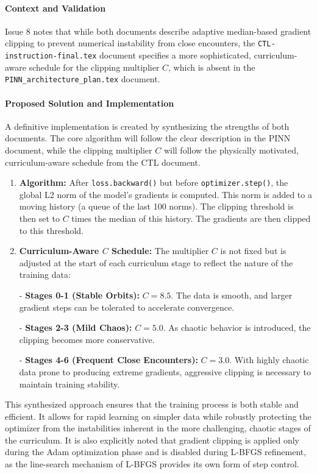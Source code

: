 \documentclass[11pt, a4paper]{article}
\begin{document}
\paragraph{Context and Validation}
Issue 8 notes that while both documents describe adaptive median-based gradient clip\-ping to prevent numerical instability from close encounters, the \texttt{CTL-instruction-\allowbreak final.tex} document specifies a more sophisticated, curriculum-aware schedule for the clipping multiplier $C$, which is absent in the \texttt{PINN\_\allowbreak architecture\_\allowbreak plan.tex} document.

\paragraph{Proposed Solution and Implementation}
A definitive implementation is created by synthesizing the strengths of both documents. The core algorithm will follow the clear description in the PINN document, while the clipping multiplier $C$ will follow the physically motivated, curriculum-aware schedule from the CTL document.
\begin{enumerate}
    \item \textbf{Algorithm:} After \texttt{loss.backward()} but before \texttt{optimizer.step()}, the global L2 norm of the model's gradients is computed. This norm is added to a moving history (a queue of the last 100 norms). The clipping threshold is then set to $C$ times the median of this history. The gradients are then clipped to this threshold.
    \item \textbf{Curriculum-Aware $C$ Schedule:} The multiplier $C$ is not fixed but is adjusted at the start of each curriculum stage to reflect the nature of the training data:
    
        
- \textbf{Stages 0-1 (Stable Orbits):} $C = 8.5$. The data is smooth, and larger gradient steps can be tolerated to accelerate convergence.
        
- \textbf{Stages 2-3 (Mild Chaos):} $C = 5.0$. As chaotic behavior is introduced, the clipping becomes more conservative.
        
- \textbf{Stages 4-6 (Frequent Close Encounters):} $C = 3.0$. With highly chaotic data prone to producing extreme gradients, aggressive clipping is necessary to maintain training stability.
    
\end{enumerate}
This synthesized approach ensures that the training process is both stable and efficient. It allows for rapid learning on simpler data while robustly protecting the optimizer from the instabilities inherent in the more challenging, chaotic stages of the curriculum. It is also explicitly noted that gradient clipping is applied only during the Adam optimization phase and is disabled during L-BFGS refinement, as the line-search mechanism of L-BFGS provides its own form of step control.
\end{document}

